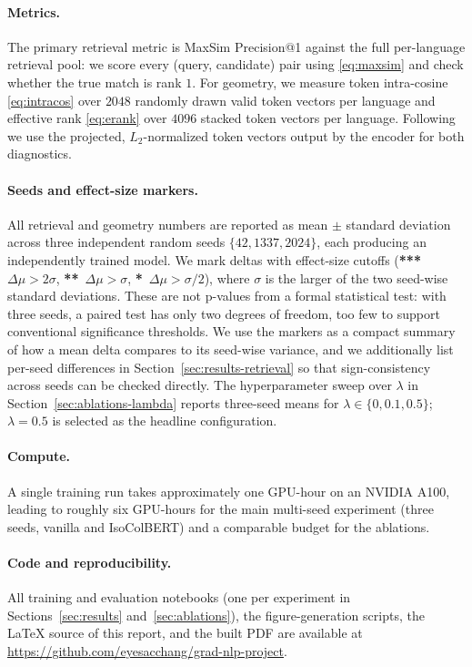 \paragraph{Metrics.} The primary retrieval metric is MaxSim Precision@1 against the full per-language retrieval pool: we score every (query, candidate) pair using \eqref{eq:maxsim} and check whether the true match is rank $1$. For geometry, we measure token intra-cosine \eqref{eq:intracos} over $2048$ randomly drawn valid token vectors per language and effective rank \eqref{eq:erank} over $4096$ stacked token vectors per language. Following \citet{ethayarajh2019contextual} we use the projected, $L_2$-normalized token vectors output by the encoder for both diagnostics.

\paragraph{Seeds and effect-size markers.} All retrieval and geometry numbers are reported as mean $\pm$ standard deviation across three independent random seeds $\{42, 1337, 2024\}$, each producing an independently trained model. We mark deltas with effect-size cutoffs (\textbf{***}~$\Delta\mu > 2\sigma$, \textbf{**}~$\Delta\mu > \sigma$, \textbf{*}~$\Delta\mu > \sigma/2$), where $\sigma$ is the larger of the two seed-wise standard deviations. These are not p-values from a formal statistical test: with three seeds, a paired test has only two degrees of freedom, too few to support conventional significance thresholds. We use the markers as a compact summary of how a mean delta compares to its seed-wise variance, and we additionally list per-seed differences in Section~\ref{sec:results-retrieval} so that sign-consistency across seeds can be checked directly. The hyperparameter sweep over $\lambda$ in Section~\ref{sec:ablations-lambda} reports three-seed means for $\lambda \in \{0, 0.1, 0.5\}$; $\lambda{=}0.5$ is selected as the headline configuration.

\paragraph{Compute.} A single training run takes approximately one GPU-hour on an NVIDIA A100, leading to roughly six GPU-hours for the main multi-seed experiment (three seeds, vanilla and IsoColBERT) and a comparable budget for the ablations.

\paragraph{Code and reproducibility.} All training and evaluation notebooks (one per experiment in Sections~\ref{sec:results} and~\ref{sec:ablations}), the figure-generation scripts, the LaTeX source of this report, and the built PDF are available at \url{https://github.com/eyesacchang/grad-nlp-project}.
